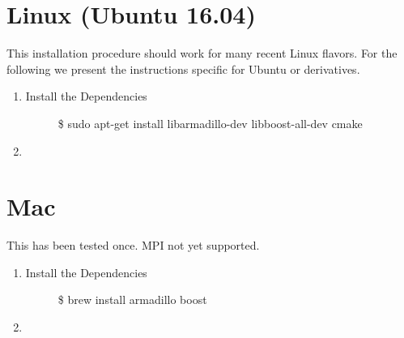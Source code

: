 \documentclass[letterpaper,10pt,english]{sphinxmanual}
\begin{document}
\section{Linux (Ubuntu 16.04)}
\label{\detokenize{installation:linux-ubuntu-16-04}}
This installation procedure should work for many recent Linux flavors. For the following
we present the instructions specific for Ubuntu or derivatives.
\begin{enumerate}
\item {} \begin{description}
\item[{Install the Dependencies}] \leavevmode
\$ sudo apt-get install libarmadillo-dev libboost-all-dev cmake

\end{description}

\item {} 

\end{enumerate}


\section{Mac}
\label{\detokenize{installation:mac}}
This has been tested once. MPI not yet supported.
\begin{enumerate}
\item {} \begin{description}
\item[{Install the Dependencies}] \leavevmode
\$ brew install armadillo boost

\end{description}

\item {} 

\end{enumerate}
\end{document}
